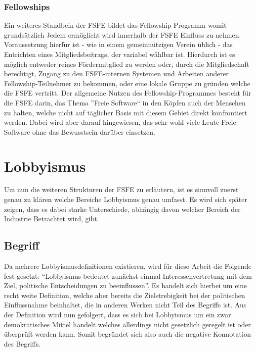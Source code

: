 \subsubsection{Fellowships}
Ein weiteres Standbein der FSFE bildet das Fellowship-Programm womit
grundsätzlich Jedem ermöglicht wird innerhalb der FSFE Einfluss zu nehmen.
Voraussetzung hierfür ist - wie in einem gemeinnützigen Verein üblich - das 
Entrichten eines Mitgliedsbeitrags, der variabel
wählbar ist. Hierdurch ist es möglich entweder reines Fördermitglied zu werden
oder, durch die Mitgliedschaft berechtigt, Zugang zu den FSFE-internen Systemen 
und Arbeiten anderer Fellowship-Teilnehmer zu bekommen, oder eine lokale Gruppe
zu gründen welche die FSFE vertritt. Der allgemeine Nutzen des 
Fellowship-Programmes besteht für die FSFE darin, das Thema ''Freie Software`` 
in 
den Köpfen auch der Menschen zu halten, welche nicht auf täglicher Basis mit 
diesem Gebiet direkt konfrontiert werden. Dabei wird aber darauf hingewiesen, 
das sehr wohl viele Leute Freie Software ohne das Bewusstsein darüber einsetzen.
\cite{PLGreveInterView}



\newpage
\section{Lobbyismus}
Um nun die weiteren Strukturen der FSFE zu erläutern, ist es sinnvoll zuerst 
genau zu klären welche Bereiche Lobbyismus genau umfasst. Es wird sich später 
zeigen, dass es dabei starke Unterschiede, abhängig davon welcher Bereich der 
Industrie Betrachtet wird, gibt.

\subsection{Begriff}
Da mehrere Lobbyismusdefinitionen existieren, wird für diese Arbeit die Folgende
fest gesetzt: ``Lobbyismus bedeutet zunächst einmal Interessenvertretung mit 
dem Ziel, politische Entscheidungen zu beeinflussen''.\cite{LeifSpeth200312} Es 
handelt sich hierbei um eine recht weite Definition, welche aber bereits die 
Zielstrebigkeit bei der politischen Einflussnahme beinhaltet, die in anderen 
Werken nicht Teil des Begriffs ist. Aus der Definition wird nun gefolgert, dass
es sich bei Lobbyismus um ein zwar demokratisches Mittel handelt welches 
allerdings nicht gesetzlich geregelt ist oder überprüft werden kann. Somit 
begründet sich also auch die negative Konnotation des Begriffs.

